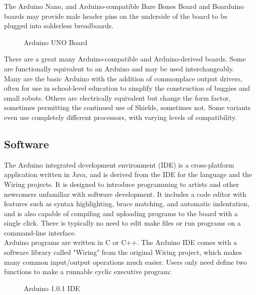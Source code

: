 \documentclass[a4paper, 12pt, notitlepage]{report}
\begin{document}
The Arduino Nano, and Arduino-compatible Bare Bones Board and Boarduino boards may provide male header pins on the underside of the board to be plugged into solderless breadboards.\\

\begin{figure}[h!]
{}
\caption{Arduino UNO Board}
\end{figure}

There are a great many Arduino-compatible and Arduino-derived boards. Some are functionally equivalent to an Arduino and may be used interchangeably. Many are the basic Arduino with the addition of commonplace output drivers, often for use in school-level education to simplify the construction of buggies and small robots. Others are electrically equivalent but change the form factor, sometimes permitting the continued use of Shields, sometimes not. Some variants even use completely different processors, with varying levels of compatibility.\\

\subsection{Software}

The Arduino integrated development environment (IDE) is a cross-platform application written in Java, and is derived from the IDE for the language and the Wiring projects. It is designed to introduce programming to artists and other newcomers unfamiliar with software development. It includes a code editor with features such as syntax highlighting, brace matching, and automatic indentation, and is also capable of compiling and uploading programs to the board with a single click. There is typically no need to edit make files or run programs on a command-line interface.\\

Arduino programs are written in C or C++. The Arduino IDE comes with a software library called "Wiring" from the original Wiring project, which makes many common input/output operations much easier. Users only need define two functions to make a runnable cyclic executive program: \\

\begin{figure}[h!]
{\par}
\caption{Arduino 1.0.1 IDE}
\end{figure}
\end{document}
